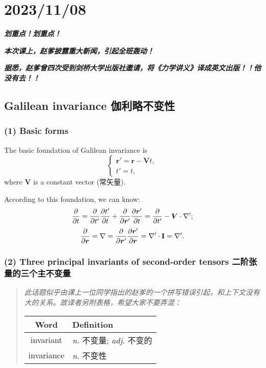 \chapter{2023/11/08}\label{20231108}

\textbf{\emph{划重点！划重点！}}

\textbf{\emph{本次课上，赵爹披露重大新闻，引起全班轰动！}}

\textbf{\emph{据悉，赵爹曾四次受到剑桥大学出版社邀请，将《力学讲义》译成英文出版！！他没有去！！}}

\section{Galilean invariance
伽利略不变性}\label{galilean-invariance-ux4f3dux5229ux7565ux4e0dux53d8ux6027}

\subsection*{(1) Basic forms}\label{basic-forms}

The basic foundation of Galilean invariance is \[\left\{
    \begin{array}{l}
        \boldsymbol r' = \boldsymbol r - \boldsymbol Vt, \\
        t' = t,
    \end{array}
\right.\] where \(\boldsymbol V\) is a constant vector (常矢量).

According to this foundation, we can know:
\[{\partial \over \partial t} = {\partial \over \partial t'}{\partial t' \over \partial t} + {\partial \over \partial \boldsymbol r'}{\partial \boldsymbol r' \over \partial t} = {\partial \over \partial t'} - \boldsymbol V \cdot \nabla';\]
\[{\partial \over \partial \boldsymbol r} = \nabla = {\partial \over \partial \boldsymbol r'}{\partial \boldsymbol r' \over \partial \boldsymbol r} = \nabla' \cdot \mathbf I = \nabla'.\]

\subsection*{(2) Three principal invariants of second-order tensors
二阶张量的三个主不变量}\label{three-principal-invariants-of-second-order-tensors-ux4e8cux9636ux5f20ux91cfux7684ux4e09ux4e2aux4e3bux4e0dux53d8ux91cf}

\begin{quote}
\emph{此话题似乎由课上一位同学指出的赵爹的一个拼写错误引起，和上下文没有大的关系。故译者另附表格，希望大家不要弄混：}
    \begin{center}
        \begin{tabular}{|c|l|}
            \hline
            \textbf{Word} & \textbf{Definition} \\
            \hline
            invariant & \textit{n.} 不变量; \textit{adj.} 不变的 \\
            \hline
            invariance & \textit{n.} 不变性 \\
            \hline
        \end{tabular}
    \end{center}
\end{quote}


